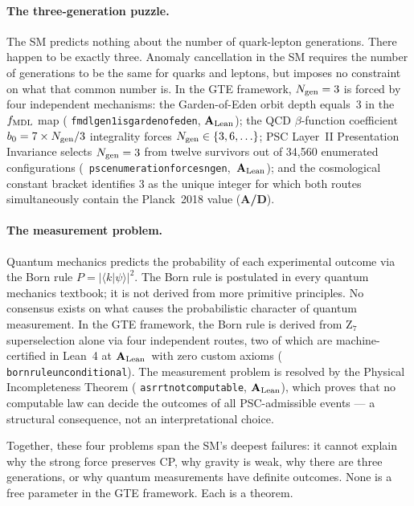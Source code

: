 \documentclass[11pt,openany]{book}
\theoremstyle{remark}
\newcommand{\lean}[1]{%
  \penalty-100
  \begingroup\def\_{\textunderscore\allowbreak}\texttt{#1}\endgroup}
\newcommand{\CatAL}{\ensuremath{\textbf{A}_{\rm Lean}}}
\newcommand{\CatAD}{\textbf{A/D}}
\begin{document}
\paragraph{The three-generation puzzle.}
The SM predicts nothing about the number of quark-lepton generations.
There happen to be exactly three.
Anomaly cancellation in the SM requires the number of generations to be the same for
quarks and leptons, but imposes no constraint on what that common number is.
In the GTE framework, $N_{\rm gen} = 3$ is forced by four independent mechanisms:
the Garden-of-Eden orbit depth equals~3 in the $f_{\rm MDL}$ map
(\lean{fmdl\_gen1\_is\_garden\_of\_eden}, \CatAL);
the QCD $\beta$-function coefficient $b_0 = 7 \times N_{\rm gen}/3$ integrality forces
$N_{\rm gen} \in \{3, 6, \ldots\}$;
PSC Layer~II Presentation Invariance selects $N_{\rm gen} = 3$ from twelve survivors
out of 34,560 enumerated configurations \mbox{(\lean{psc\_enumeration\_forces\_ngen\_3}, \CatAL)};
and the cosmological constant bracket identifies 3 as the unique integer for which
both routes simultaneously contain the Planck~2018 value (\CatAD).

\paragraph{The measurement problem.}
Quantum mechanics predicts the probability of each experimental outcome via the Born
rule $P = |\langle k|\psi\rangle|^2$.
The Born rule is postulated in every quantum mechanics textbook; it is not derived from
more primitive principles.
No consensus exists on what causes the probabilistic character of quantum measurement.
In the GTE framework, the Born rule is derived from Z$_7$ superselection alone via four
independent routes, two of which are machine-certified in Lean~4 at \CatAL\ with zero
custom axioms (\lean{born\_rule\_unconditional}).
The measurement problem is resolved by the Physical Incompleteness Theorem
(\lean{asr\_rt\_not\_computable}, \CatAL), which proves that no computable law can
decide the outcomes of all PSC-admissible events --- a structural consequence, not an
interpretational choice.

Together, these four problems span the SM's deepest failures: it cannot explain why the
strong force preserves CP, why gravity is weak, why there are three generations, or why
quantum measurements have definite outcomes.
None is a free parameter in the GTE framework.
Each is a theorem.

\end{document}
